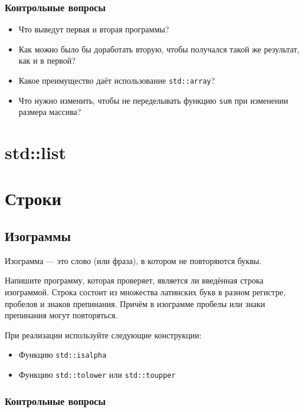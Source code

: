 \documentclass[10pt,twoside,openany]{book}
\begin{document}




\subsection*{Контрольные вопросы}

\begin{itemize}
    \item Что выведут первая и вторая программы?
    \item Как можно было бы доработать вторую, чтобы получался такой же результат, как и в первой?
    \item Какое преимущество даёт использование {\tt std::array}?
    \item Что нужно изменить, чтобы не переделывать функцию {\tt sum} при изменении размера массива?
\end{itemize}

\chapter{std::list}

\chapter{Строки}

\section{Изограммы}

Изограмма --- это слово (или фраза), в котором не повторяются буквы.

Напишите программу, которая проверяет, является ли введённая строка изограммой.
Строка состоит из множества латинских букв в разном регистре, пробелов и знаков препинания.
Причём в изограмме пробелы или знаки препинания могут повторяться.

При реализации используйте следующие конструкции:
\begin{itemize}
    \item Функцию {\tt std::isalpha}
    \item Функцию {\tt std::tolower} или {\tt std::toupper}
\end{itemize}

\subsection*{Контрольные вопросы}
\end{document}
